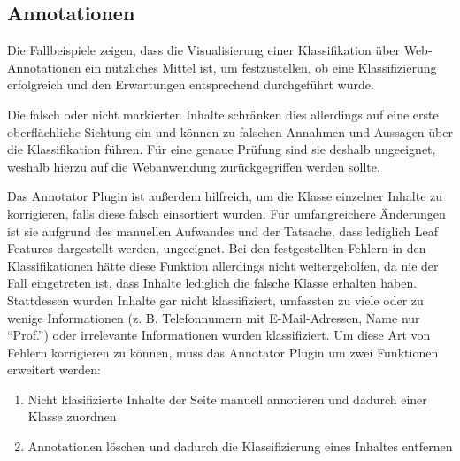 \subsection{Annotationen}
    Die Fallbeispiele zeigen, dass die Visualisierung einer Klassifikation
    über Web-Annotationen ein nützliches Mittel ist, um festzustellen,
    ob eine Klassifizierung erfolgreich und den Erwartungen entsprechend durchgeführt wurde.

    Die falsch oder nicht markierten Inhalte schränken dies allerdings
    auf eine erste oberflächliche Sichtung ein
    und können zu falschen Annahmen und Aussagen über die Klassifikation führen.
    Für eine genaue Prüfung sind sie deshalb ungeeignet,
    weshalb hierzu auf die Webanwendung zurückgegriffen werden sollte.

    Das Annotator Plugin ist außerdem hilfreich,
    um die Klasse einzelner Inhalte zu korrigieren,
    falls diese falsch einsortiert wurden.
    Für umfangreichere Änderungen ist sie aufgrund des manuellen Aufwandes
    und der Tatsache, dass lediglich Leaf Features dargestellt werden,
    ungeeignet.
    Bei den festgestellten Fehlern in den Klassifikationen hätte diese
    Funktion allerdings nicht weitergeholfen,
    da nie der Fall eingetreten ist, dass Inhalte lediglich die falsche Klasse erhalten haben.
    Stattdessen wurden Inhalte gar nicht klassifiziert,
    umfassten zu viele oder zu wenige Informationen
    (z. B. Telefonnumern mit E-Mail-Adressen, Name nur "`Prof."')
    oder irrelevante Informationen wurden klassifiziert.
    Um diese Art von Fehlern korrigieren zu können,
    muss das Annotator Plugin um zwei Funktionen erweitert werden:

    \begin{enumerate}
        \item Nicht klasifizierte Inhalte der Seite manuell annotieren und dadurch einer Klasse zuordnen
        \item Annotationen löschen und dadurch die Klassifizierung eines Inhaltes entfernen
    \end{enumerate}
